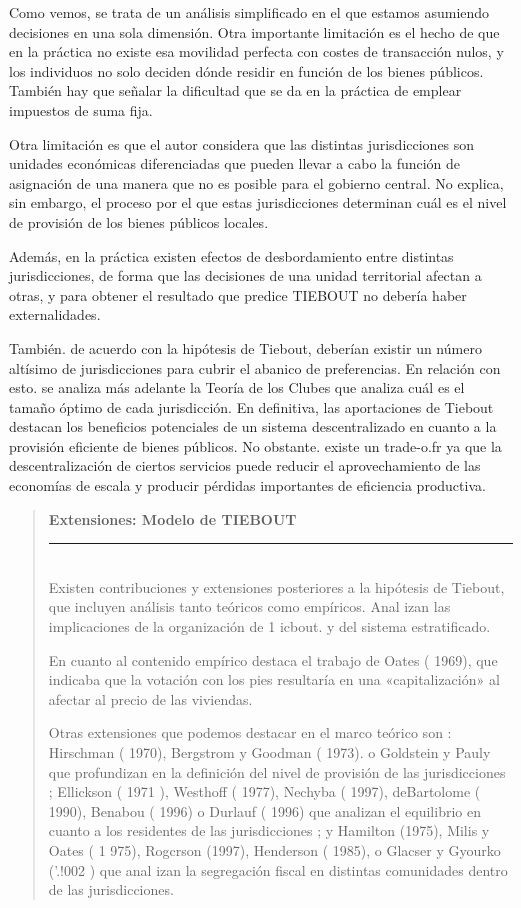 \documentclass[10pt,a4paper]{article}
\newenvironment{specialblock}[1]{%
      \begin{quote} %
      \small %
      \noindent\textbf{#1}\\[-0.3em] %
      \rule{\linewidth}{0.4pt}\\[0.6em]}{
      \end{quote}}
\begin{document}
Como vemos, se trata de un análisis simplificado en el que estamos asumiendo decisiones en una sola dimensión. Otra importante limitación es el hecho de que en la práctica no existe esa movilidad perfecta con costes de transacción nulos, y los individuos no solo deciden dónde residir en función de los bienes públicos. También hay que señalar la dificultad que se da en la práctica de emplear impuestos de suma fija.

Otra limitación es que el autor considera que las distintas jurisdicciones son unidades económicas diferenciadas que pueden llevar a cabo la función de asignación de una manera que no es posible para el gobierno central. No explica, sin embargo, el proceso por el que estas jurisdicciones determinan cuál es el nivel de provisión de los bienes públicos locales.

Además, en la práctica existen efectos de desbordamiento entre distintas jurisdicciones, de forma que las decisiones de una unidad territorial afectan a otras, y para obtener el resultado que predice TIEBOUT no debería haber externalidades.

También. de acuerdo con la hipótesis de Tiebout, deberían existir un número altísimo de jurisdicciones para cubrir el abanico de preferencias. En relación con esto. se analiza más adelante la Teoría de los Clubes que analiza cuál es el tamaño óptimo de cada jurisdicción. En definitiva, las aportaciones de Tiebout destacan los beneficios potenciales de un sistema descentralizado en cuanto a la provisión eficiente de bienes públicos. No obstante. existe un trade-o.fr ya que la descentralización de ciertos servicios puede reducir el aprovechamiento de las economías de escala y producir pérdidas importantes de eficiencia productiva.

\begin{specialblock}{\textbf{Extensiones:} Modelo de TIEBOUT}
    Existen contribuciones y extensiones posteriores a la hipótesis de Tiebout, que incluyen análisis tanto teóricos como empíricos. Anal izan las implicaciones de la organización de 1 icbout. y del sistema estratificado.
    
    En cuanto al contenido empírico destaca el trabajo de Oates ( 1969), que indicaba que la votación con los pies resultaría en una «capitalización» al afectar al precio de las viviendas.
    
    Otras extensiones que podemos destacar en el marco teórico son : Hirschman ( 1970), Bergstrom y Goodman ( 1973). o Goldstein y Pauly que profundizan en la definición del nivel de provisión de las jurisdicciones ; Ellickson ( 1971 ), Westhoff ( 1977), Nechyba ( 1997), deBartolome ( 1990), Benabou ( 1996) o Durlauf ( 1996) que analizan el equilibrio en cuanto a los residentes de las jurisdicciones ; y Hamilton (1975), Milis y Oates ( 1 975), Rogcrson (1997), Henderson ( 1985), o Glacser y Gyourko ('.!002 ) que anal izan la segregación fiscal en distintas comunidades dentro de las jurisdicciones.
\end{specialblock}
\end{document}
